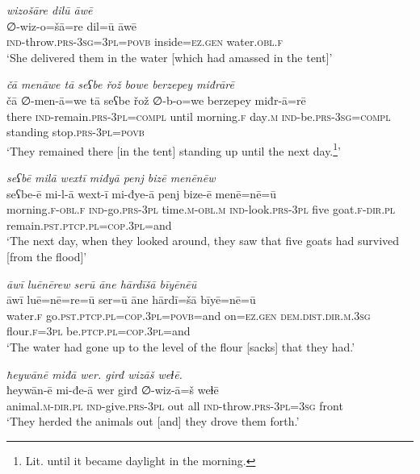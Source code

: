 \ea \label{ZB.25}
\textit{wizošāre dilū āwē} \\ 
\gll ∅-wiz-o=šā=re dil=ū āwē \\ 
 \textsc{ind-}throw\textsc{.prs}\textsc{-3sg=3pl}\textsc{=\textsc{povb}} inside\textsc{\textsc{=ez.gen}} water\textsc{.obl}\textsc{.f} \\ 
\glt `She delivered them in the water [which had amassed in the tent]'
\z 
 
\ea \label{ZB.26}
\textit{čā menāwe tā seʕbe řož bowe berzepey miđrārē} \\ 
\gll čā ∅-men-ā=we tā seʕbe řož ∅-b-o=we berzepey miđr-ā=rē \\ 
 there \textsc{ind-}remain\textsc{.prs}\textsc{-3pl}\textsc{=compl} until morning\textsc{.f} day\textsc{.m} \textsc{ind-}be\textsc{.prs}\textsc{-3sg}\textsc{=\textsc{compl}} standing stop\textsc{.prs}\textsc{-3pl}\textsc{=\textsc{povb}} \\ 
\glt `They remained there [in the tent] standing up until the next day.\footnote{Lit. until it became daylight in the morning.}'
\z 
 
\ea \label{ZB.27}
\textit{seʕbē milā wextī miđyā penj bizē menēnēw} \\ 
\gll seʕbe-ē mi-l-ā wext-ī mi-đye-ā penj bize-ē menē=nē=ū \\ 
 morning\textsc{.f}\textsc{-obl}\textsc{.f} \textsc{ind-}go\textsc{.prs}\textsc{-3pl} time\textsc{.m}\textsc{-obl}\textsc{.m} \textsc{ind-}look\textsc{.prs}\textsc{-3pl} five goat\textsc{.f}\textsc{-dir}\textsc{.pl} remain\textsc{.pst}\textsc{.ptcp}\textsc{.pl}\textsc{=cop}\textsc{.3pl}=and \\ 
\glt `The next day, when they looked around, they saw that five goats had survived [from the flood]'
\z 
 
\ea \label{ZB.28}
\textit{āwī luēnērew serū āne hārdīšā bīyēnēū} \\ 
\gll āwī luē=nē=re=ū ser=ū āne hārdī=šā bīyē=nē=ū \\ 
 water\textsc{.f} go\textsc{.pst}\textsc{.ptcp}\textsc{.pl}\textsc{=cop}\textsc{.3pl}\textsc{=\textsc{povb}}=and on\textsc{\textsc{=ez.gen}} \textsc{dem.dist}\textsc{.dir}\textsc{.m}\textsc{.3sg} flour\textsc{.f}\textsc{=3pl} be\textsc{.ptcp}\textsc{.pl}\textsc{=cop}\textsc{.3pl}=and \\ 
\glt `The water had gone up to the level of the flour [sacks] that they had.'
\z 
 
\ea \label{ZB.31}
\textit{ħeywānē miđā wer. girđ wizāš weɫē.} \\ 
\gll ħeywān-ē mi-đe-ā wer girđ ∅-wiz-ā=š weɫē \\ 
 animal\textsc{.m}\textsc{-dir}\textsc{.pl} \textsc{ind-}give\textsc{.prs}\textsc{-3pl} out all \textsc{ind-}throw\textsc{.prs}\textsc{-3pl}\textsc{=3sg} front \\ 
\glt `They herded the animals out [and] they drove them forth.'
\z 
 
